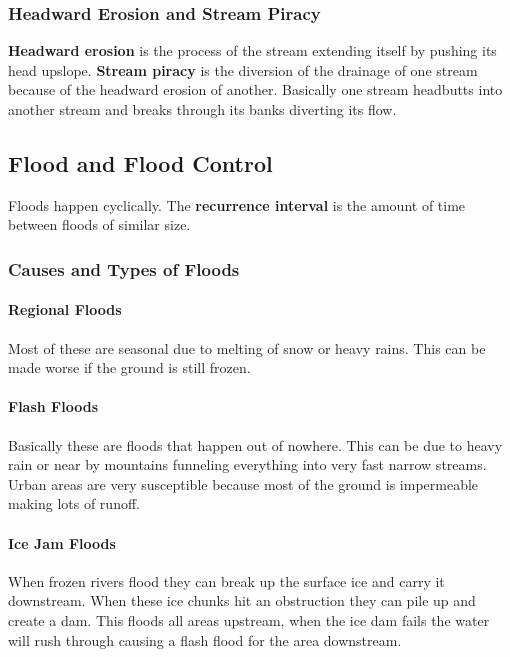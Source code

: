 \documentclass{article}
\begin{document}
\subsubsection{Headward Erosion and Stream Piracy} %
\label{ssub:headward_erosion_and_stream_piracy}
\textbf{Headward erosion} is the process of the stream extending itself by pushing its head upslope. \textbf{Stream piracy} is the diversion of the drainage of one stream because of the headward erosion of another. Basically one stream headbutts into another stream and breaks through its banks diverting its flow.

\subsection{Flood and Flood Control} %
\label{sub:flood_and_flood_control}
Floods happen cyclically. The \textbf{recurrence interval} is the amount of time between floods of similar size.

\subsubsection{Causes and Types of Floods} %
\label{ssub:causes_and_types_of_floods}
\paragraph{Regional Floods} %
\label{par:regional_floods}
Most of these are seasonal due to melting of snow or heavy rains. This can be made worse if the ground is still frozen.
\paragraph{Flash Floods} %
\label{par:flash_floods}
Basically these are floods that happen out of nowhere. This can be due to heavy rain or near by mountains funneling everything into very fast narrow streams. Urban areas are very susceptible because most of the ground is impermeable making lots of runoff.
\paragraph{Ice Jam Floods} %
\label{par:ice_jam_floods}
When frozen rivers flood they can break up the surface ice and carry it downstream. When these ice chunks hit an obstruction they can pile up and create a dam. This floods all areas upstream, when the ice dam fails the water will rush through causing a flash flood for the area downstream.
\end{document}
